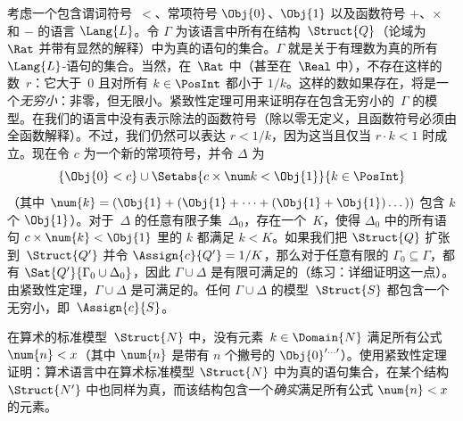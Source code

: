 \documentclass[../../../include/open-logic-section]{subfiles}
\begin{document}
{\begin{ex}
考虑一个包含谓词符号~$<$、常项符号 $\Obj{0}$、$\Obj{1}$ 以及函数符号 $+$、$\times$ 和 $-$ 的语言 $\Lang{L}$。令 $\Gamma$ 为该语言中所有在结构~$\Struct{Q}$（论域为 $\Rat$ 并带有显然的解释）中为真的语句的集合。$\Gamma$ 就是关于有理数为真的所有~$\Lang{L}$-语句的集合。当然，在~$\Rat$ 中（甚至在~$\Real$ 中），不存在这样的数~$r$：它大于~$0$ 且对所有 $k \in \PosInt$ 都小于 $1/k$。这样的数如果存在，将是一个\emph{无穷小}：非零，但无限小。紧致性定理可用来证明存在包含无穷小的~$\Gamma$ 的模型。在我们的语言中没有表示除法的函数符号（除以零无定义，且函数符号必须由全函数解释）。不过，我们仍然可以表达 $r < 1/k$，因为这当且仅当 $r \cdot k < 1$ 时成立。现在令 $c$ 为一个新的常项符号，并令 $\Delta$ 为
\[
\{\Obj{0} < c\}
\cup \Setabs{ c \times \num k < \Obj{1} }{k \in \PosInt}
\]
（其中 $\num{k} = (\Obj{1} + (\Obj{1} + \dots + (\Obj{1} +
\Obj{1})\dots))$ 包含 $k$ 个 $\Obj{1}$）。对于~$\Delta$ 的任意有限子集~$\Delta_0$，存在一个~$K$，使得 $\Delta_0$ 中的所有语句 $c \times \num{k} < \Obj{1}$ 里的 $k$ 都满足 $k < K$。如果我们把 $\Struct{Q}$ 扩张到~$\Struct{Q'}$ 并令 $\Assign{c}{Q'} = 1/K$，那么对于任意有限的 $\Gamma_0 \subseteq \Gamma$，都有 $\Sat{Q'}{\Gamma_0 \cup \Delta_0}$，因此 $\Gamma \cup \Delta$ 是有限可满足的（练习：详细证明这一点）。由紧致性定理，$\Gamma \cup \Delta$ 是可满足的。任何 $\Gamma \cup \Delta$ 的模型~$\Struct{S}$ 都包含一个无穷小，即~$\Assign{c}{S}$。
\end{ex}
}{}

\begin{prob}
在算术的标准模型~$\Struct{N}$ 中，没有元素~$k \in \Domain{N}$ 满足所有公式~$\num{n} < x$（其中 $\num{n}$ 是带有 $n$ 个撇号的 $\Obj{0}^{\prime\dots\prime}$）。使用紧致性定理证明：算术语言中在算术标准模型 $\Struct{N}$ 中为真的语句集合，在某个结构~$\Struct{N'}$ 中也同样为真，而该结构包含一个\emph{确实}满足所有公式 $\num{n} < x$ 的元素。
\end{prob}
\tagendprob

\end{document}
